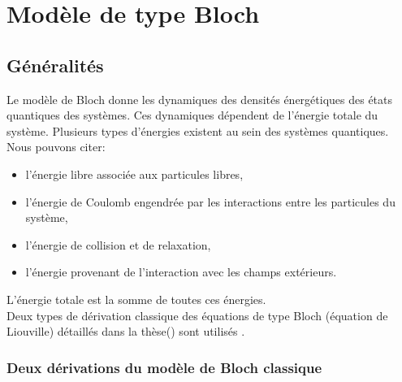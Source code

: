 \documentclass[12pt,a4paper,openany,oneside]{book}
\begin{document}
 \chapter{Modèle de type Bloch}
 
 \section{Généralités}
 Le modèle de Bloch donne les dynamiques des densités énergétiques des états quantiques des systèmes. Ces dynamiques dépendent de l’énergie totale du système. Plusieurs types d’énergies existent au sein des systèmes quantiques. Nous pouvons citer:
 \begin{itemize}[label=$\centerdot$]
 \item l’énergie libre associée aux particules libres,
 \item l’énergie de Coulomb engendrée par les interactions entre les particules du système,
 \item l’énergie de collision et de relaxation,
 \item l’énergie provenant de l’interaction avec les champs extérieurs.
 \end{itemize}
%
L’énergie totale est la somme de toutes ces énergies.\\
Deux types de dérivation classique des équations de type Bloch (équation de Liouville) détaillés dans la thèse(\cite{mareference1}) sont utilisés .
\subsection{Deux dérivations du modèle de Bloch classique}
\end{document}
